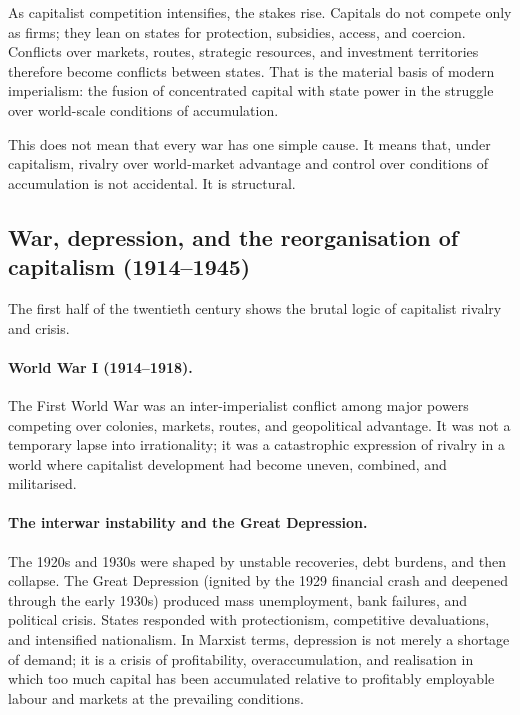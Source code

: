 As capitalist competition intensifies, the stakes rise. Capitals do not compete only as firms; they lean on
states for protection, subsidies, access, and coercion. Conflicts over markets, routes, strategic resources, and
investment territories therefore become conflicts between states. That is the material basis of modern imperialism:
the fusion of concentrated capital with state power in the struggle over world-scale conditions of accumulation.

This does not mean that every war has one simple cause. It means that, under capitalism, rivalry over world-market
advantage and control over conditions of accumulation is not accidental. It is structural.

\subsection{War, depression, and the reorganisation of capitalism (1914--1945)}
\label{subsec:1914-1945}

The first half of the twentieth century shows the brutal logic of capitalist rivalry and crisis.

\paragraph{World War I (1914--1918).}
The First World War was an inter-imperialist conflict among major powers competing over colonies, markets,
routes, and geopolitical advantage. It was not a temporary lapse into irrationality; it was a catastrophic
expression of rivalry in a world where capitalist development had become uneven, combined, and militarised.

\paragraph{The interwar instability and the Great Depression.}
The 1920s and 1930s were shaped by unstable recoveries, debt burdens, and then collapse. The Great Depression
(ignited by the 1929 financial crash and deepened through the early 1930s) produced mass unemployment,
bank failures, and political crisis. States responded with protectionism, competitive devaluations,
and intensified nationalism. In Marxist terms, depression is not merely a shortage of demand; it is a crisis
of profitability, overaccumulation, and realisation in which too much capital has been accumulated relative to
profitably employable labour and markets at the prevailing conditions.

